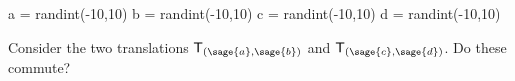 \documentclass{ximera}
\author{Jenny Sheldon \and Bart Snapp}
\begin{document}
\makerandom


\begin{sagesilent}
a = randint(-10,10)
b = randint(-10,10)
c = randint(-10,10)
d = randint(-10,10)
\end{sagesilent}

\begin{exercise}
  Consider the two translations $\mat{T}_{(\sage{a},\sage{b})}$ and $ \mat{T}_{(\sage{c},\sage{d})}$. Do these commute?

    \begin{prompt}
    \begin{multipleChoice}
    \end{multipleChoice}
  \end{prompt}
\end{exercise}
\end{document}
